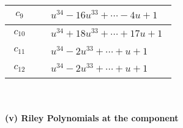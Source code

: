 \documentclass[1p]{elsarticle_modified}
\theoremstyle{definition}
\begin{document}
\begin{tabular}{m{50pt}|m{274pt}}
\hline $$\begin{aligned}c_{9}\end{aligned}$$&$\begin{aligned}
&u^{34}-16 u^{33}+\cdots-4 u+1
\end{aligned}$\\
\hline $$\begin{aligned}c_{10}\end{aligned}$$&$\begin{aligned}
&u^{34}+18 u^{33}+\cdots+17 u+1
\end{aligned}$\\
\hline $$\begin{aligned}c_{11}\end{aligned}$$&$\begin{aligned}
&u^{34}-2 u^{33}+\cdots+u+1
\end{aligned}$\\
\hline $$\begin{aligned}c_{12}\end{aligned}$$&$\begin{aligned}
&u^{34}-2 u^{33}+\cdots+u+1
\end{aligned}$\\
\hline
\end{tabular}\\~\\
\newpage\renewcommand{\arraystretch}{1}
\flushleft \textbf{(v) Riley Polynomials at the component}\newline \\
\end{document}

